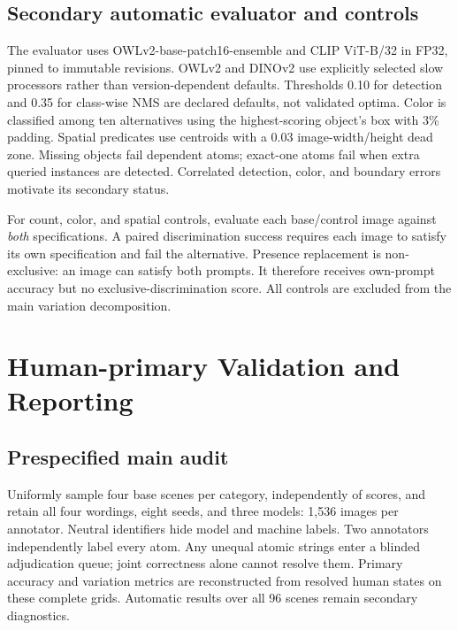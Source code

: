 \documentclass[10pt,letterpaper]{article}
\begin{document}
\subsection{Secondary automatic evaluator and controls}
The evaluator uses OWLv2-base-patch16-ensemble \cite{owlv2} and CLIP ViT-B/32 \cite{clip} in FP32, pinned to immutable revisions. OWLv2 and DINOv2 use explicitly selected slow processors rather than version-dependent defaults. Thresholds 0.10 for detection and 0.35 for class-wise NMS are declared defaults, not validated optima. Color is classified among ten alternatives using the highest-scoring object's box with 3\% padding. Spatial predicates use centroids with a 0.03 image-width/height dead zone. Missing objects fail dependent atoms; exact-one atoms fail when extra queried instances are detected. Correlated detection, color, and boundary errors motivate its secondary status.

For count, color, and spatial controls, evaluate each base/control image against \emph{both} specifications. A paired discrimination success requires each image to satisfy its own specification and fail the alternative. Presence replacement is non-exclusive: an image can satisfy both prompts. It therefore receives own-prompt accuracy but no exclusive-discrimination score. All controls are excluded from the main variation decomposition.

\section{Human-primary Validation and Reporting}

\subsection{Prespecified main audit}
Uniformly sample four base scenes per category, independently of scores, and retain all four wordings, eight seeds, and three models: 1,536 images per annotator. Neutral identifiers hide model and machine labels. Two annotators independently label every atom. Any unequal atomic strings enter a blinded adjudication queue; joint correctness alone cannot resolve them. Primary accuracy and variation metrics are reconstructed from resolved human states on these complete grids. Automatic results over all 96 scenes remain secondary diagnostics.
\end{document}

